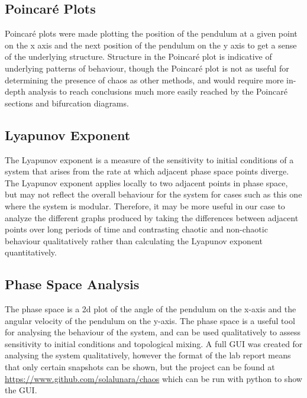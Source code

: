 \documentclass[11pt]{article} %
\begin{document}
    \subsection{Poincar\'e Plots}
        Poincar\'e plots were made plotting the position of the pendulum at a given point on the x axis and the next position of
        the pendulum on the y axis to get a sense of the underlying structure. Structure in the Poincar\'e plot is indicative
        of underlying patterns of behaviour, though the Poincar\'e plot is not as useful for determining the presence of chaos
        as other methods, and would require more in-depth analysis to reach conclusions much more easily reached by the Poincar\'e
        sections and bifurcation diagrams.\\
    \subsection{Lyapunov Exponent}
        The Lyapunov exponent is a measure of the sensitivity to initial conditions of a system that arises from the rate at which
        adjacent phase space points diverge. The Lyapunov exponent applies locally to two adjacent points in phase space, but may
        not reflect the overall behaviour for the system for cases such as this one where the system is modular. Therefore, it may be
        more useful in our case to analyze the different graphs produced by taking the differences between adjacent points over long
        periods of time and contrasting chaotic and non-chaotic behaviour qualitatively rather than calculating the Lyapunov exponent
        quantitatively.\\
    \subsection{Phase Space Analysis}
        The phase space is a 2d plot of the angle of the pendulum on the x-axis and the angular velocity of the pendulum on the y-axis. 
        The phase space is a useful tool for analysing the behaviour of the system, and can be used qualitatively to assess sensitivity 
        to initial conditions and topological mixing. A full GUI was created for analysing the system qualitatively, however the format
        of the lab report means that only certain snapshots can be shown, but the project can be found at 
        \href{https://www.github.com/solalunara/chaos}{https://www.github.com/solalunara/chaos} which can be run with python to show the GUI.\\
\end{document}
